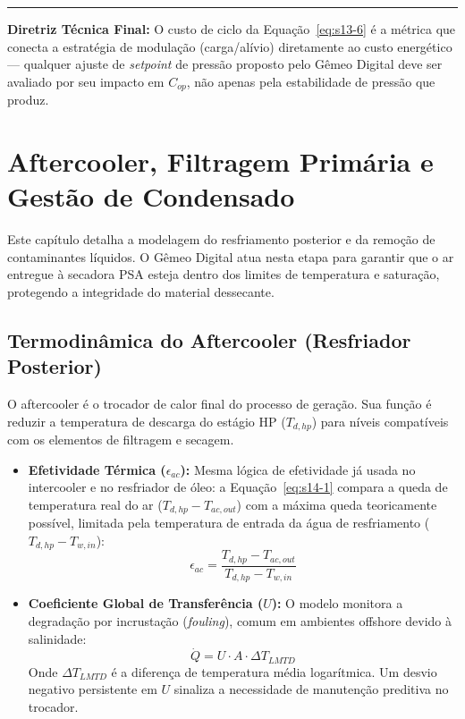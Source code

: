 \documentclass[12pt,a4paper]{article}
\numberwithin{equation}{section}
\numberwithin{table}{section}
\numberwithin{figure}{section}
\begin{document}
	\vspace{1em}
	\hrule
	\vspace{1em}

	\textbf{Diretriz Técnica Final:} O custo de ciclo da Equação~\eqref{eq:s13-6} é a métrica que conecta a estratégia de modulação (carga/alívio) diretamente ao custo energético — qualquer ajuste de \textit{setpoint} de pressão proposto pelo Gêmeo Digital deve ser avaliado por seu impacto em $C_{op}$, não apenas pela estabilidade de pressão que produz.

	\section{Aftercooler, Filtragem Primária e Gestão de Condensado}
	
	Este capítulo detalha a modelagem do resfriamento posterior e da remoção de contaminantes líquidos. O Gêmeo Digital atua nesta etapa para garantir que o ar entregue à secadora PSA esteja dentro dos limites de temperatura e saturação, protegendo a integridade do material dessecante.
	
	\subsection{Termodinâmica do Aftercooler (Resfriador Posterior)}
	O aftercooler é o trocador de calor final do processo de geração. Sua função é reduzir a temperatura de descarga do estágio HP ($T_{d,hp}$) para níveis compatíveis com os elementos de filtragem e secagem.
	
	\begin{itemize}
		\item \textbf{Efetividade Térmica ($\epsilon_{ac}$):} Mesma lógica de efetividade já usada no intercooler e no resfriador de óleo: a Equação~\eqref{eq:s14-1} compara a queda de temperatura real do ar ($T_{d,hp} - T_{ac,out}$) com a máxima queda teoricamente possível, limitada pela temperatura de entrada da água de resfriamento ($T_{d,hp} - T_{w,in}$):
		\begin{equation}\label{eq:s14-1}
 \epsilon_{ac} = \frac{T_{d,hp} - T_{ac,out}}{T_{d,hp} - T_{w,in}}
\end{equation}
		\item \textbf{Coeficiente Global de Transferência ($U$):} O modelo monitora a degradação por incrustação (\textit{fouling}), comum em ambientes offshore devido à salinidade:
		\begin{equation}\label{eq:s14-2}
 \dot{Q} = U \cdot A \cdot \Delta T_{LMTD} 
\end{equation}
		Onde $\Delta T_{LMTD}$ é a diferença de temperatura média logarítmica. Um desvio negativo persistente em $U$ sinaliza a necessidade de manutenção preditiva no trocador.
	\end{itemize}
	
\end{document}
